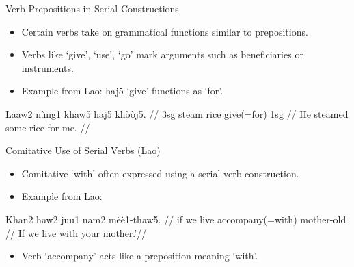 \documentclass{beamer}
\begin{document}
\begin{frame}{Verb-Prepositions in Serial Constructions}
\begin{itemize}
    \item Certain verbs take on grammatical functions similar to prepositions.
    \item Verbs like ‘give’, ‘use’, ‘go’ mark arguments such as beneficiaries or instruments.
    \item Example from Lao: haj5 ‘give’ functions as ‘for’.
\end{itemize}
\ex
\begingl
\gla Laaw2 nùng1 khaw5 haj5 khòòj5. //
\glb 3sg steam rice give(=for) 1sg //
\glft He steamed some rice for me. //
\endgl
\xe
\end{frame}

\begin{frame}{Comitative Use of Serial Verbs (Lao)}
\begin{itemize}
    \item Comitative ‘with’ often expressed using a serial verb construction.
    \item Example from Lao:
\end{itemize}
\ex
\begingl
\gla Khan2 haw2 juu1 nam2 mèè1-thaw5. //
\glb if we live accompany(=with) mother-old //
\glft If we live with your mother.’//
\endgl
\xe
\begin{itemize}
    \item Verb ‘accompany’ acts like a preposition meaning ‘with’.
\end{itemize}
\end{frame}
\end{document}
